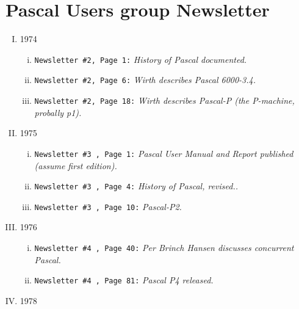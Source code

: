 \chapter{Pascal Users group Newsletter}

\begin{enumerate}[I.]

\item 1974

\begin{enumerate}[i.]

\item \texttt{Newsletter \#2, Page 1:} \textit{History of Pascal documented.}

\item \texttt{Newsletter \#2, Page 6:} \textit{Wirth describes Pascal 6000-3.4.}

\item \texttt{Newsletter \#2, Page 18:} \textit{Wirth describes Pascal-P (the P-machine, probally p1).}

\end{enumerate}

\item 1975

\begin{enumerate}[i.]

\item \texttt{Newsletter \#3 , Page 1:} \textit{Pascal User Manual and Report published (assume first edition).}

\item \texttt{Newsletter \#3 , Page 4:} \textit{History of Pascal, revised..}

\item \texttt{Newsletter \#3 , Page 10:} \textit{Pascal-P2.}

\end{enumerate}

\item 1976

\begin{enumerate}[i.]

\item \texttt{Newsletter \#4 , Page 40:} \textit{Per Brinch Hansen discusses concurrent Pascal.}

\item \texttt{Newsletter \#4 , Page 81:} \textit{Pascal P4 released.}

\end{enumerate}

\item 1978


\end{enumerate}
